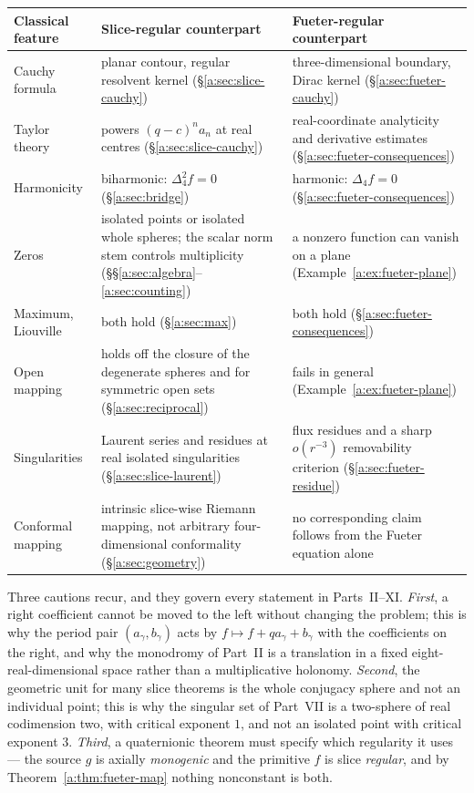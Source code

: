 \documentclass[11pt,a4paper]{article}
\numberwithin{equation}{section}
\theoremstyle{definition}
\theoremstyle{remark}
\theoremstyle{plain}
\newcommand{\lap}{\Delta_4}
\begin{document}
\begin{center}
\small
\renewcommand{\arraystretch}{1.22}
\begin{tabular}{@{}p{}p{}p{}@{}}
\toprule
Classical feature & Slice-regular counterpart & Fueter-regular counterpart\\
\midrule
Cauchy formula & planar contour, regular resolvent kernel
 (\S\ref{a:sec:slice-cauchy}) & three-dimensional boundary, Dirac kernel
 (\S\ref{a:sec:fueter-cauchy})\\
Taylor theory & powers $(q-c)^na_n$ at real centres
 (\S\ref{a:sec:slice-cauchy}) & real-coordinate analyticity and derivative
 estimates (\S\ref{a:sec:fueter-consequences})\\
Harmonicity & biharmonic: $\lap^2f=0$ (\S\ref{a:sec:bridge}) & harmonic:
 $\lap f=0$ (\S\ref{a:sec:fueter-consequences})\\
Zeros & isolated points or isolated whole spheres; the scalar norm stem
 controls multiplicity (\S\S\ref{a:sec:algebra}--\ref{a:sec:counting}) &
 a nonzero function can vanish on a plane
 (Example~\ref{a:ex:fueter-plane})\\
Maximum, Liouville & both hold (\S\ref{a:sec:max}) & both hold
 (\S\ref{a:sec:fueter-consequences})\\
Open mapping & holds off the closure of the degenerate spheres and for
 symmetric open sets (\S\ref{a:sec:reciprocal}) & fails in general
 (Example~\ref{a:ex:fueter-plane})\\
Singularities & Laurent series and residues at real isolated singularities
 (\S\ref{a:sec:slice-laurent}) & flux residues and a sharp $o(r^{-3})$
 removability criterion (\S\ref{a:sec:fueter-residue})\\
Conformal mapping & intrinsic slice-wise Riemann mapping, not arbitrary
 four-dimensional conformality (\S\ref{a:sec:geometry}) & no corresponding
 claim follows from the Fueter equation alone\\
\bottomrule
\end{tabular}
\end{center}

\medskip
Three cautions recur, and they govern every statement in Parts~II--XI.
\emph{First}, a right coefficient cannot be moved to the left without changing
the problem; this is why the period pair $(a_\gamma,b_\gamma)$ acts by
$f\mapsto f+qa_\gamma+b_\gamma$ with the coefficients on the right, and why
the monodromy of Part~II is a translation in a fixed eight-real-dimensional
space rather than a multiplicative holonomy. \emph{Second}, the geometric unit
for many slice theorems is the whole conjugacy sphere and not an individual
point; this is why the singular set of Part~VII is a two-sphere of real
codimension two, with critical exponent $1$, and not an isolated point with
critical exponent $3$. \emph{Third}, a quaternionic theorem must specify which
regularity it uses --- the source $g$ is axially \emph{monogenic} and the
primitive $f$ is slice \emph{regular}, and by Theorem~\ref{a:thm:fueter-map}
nothing nonconstant is both.
\end{document}
